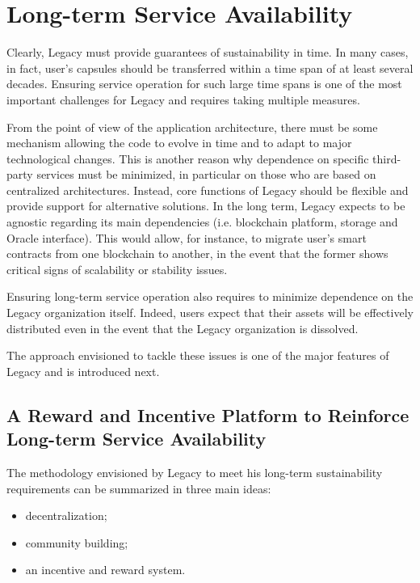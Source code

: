 \section{Long-term Service Availability} %
\label{sub:long_term_service_availability}
Clearly, Legacy must provide guarantees of sustainability in time. In many cases, in fact, user's capsules should be transferred within a time span of at least several decades.  Ensuring service operation for such large time spans is one of the most important challenges for Legacy and requires taking multiple measures. 

From the point of view of the application architecture, there must be some mechanism allowing the code to evolve in time and to adapt to major technological changes. This is another reason why dependence on specific third-party services must be minimized, in particular on those who are based on centralized architectures. Instead, core functions of Legacy should be flexible and provide support for alternative solutions.
In the long term, Legacy expects to be agnostic regarding its main dependencies (i.e. blockchain platform, storage and Oracle interface). This would allow, for instance, to migrate user’s smart contracts from one blockchain to another, in the event that the former shows critical signs of scalability or stability issues. 

Ensuring long-term service operation also requires to minimize dependence on the Legacy organization itself. Indeed, users expect that their assets will be effectively distributed even in the event that the Legacy organization is dissolved. 

The approach envisioned to tackle these issues is one of the major features of Legacy and is introduced next.

\subsection*{A Reward and Incentive Platform to Reinforce Long-term Service Availability} %
\label{sub:a_reward_and_incentivisation_system}
The methodology envisioned by Legacy to meet his long-term sustainability requirements can be summarized in three main ideas:
\begin{itemize}
	\item decentralization;
	\item community building;
	\item an incentive and reward system.
\end{itemize}

